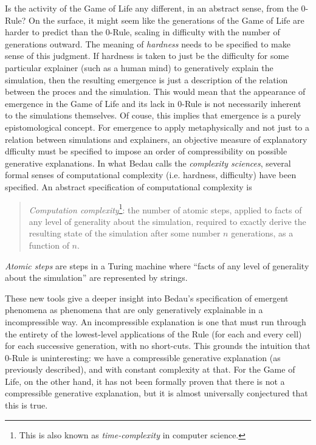 \documentclass{article}
\newcommand{\ti}[1]{\textit{#1}}
\begin{document}
Is the activity of the Game of Life any different, in an abstract sense, from the 0-Rule? On the surface, it might seem like the generations of the Game of Life are harder to predict than the 0-Rule, scaling in difficulty with the number of generations outward. The meaning of \ti{hardness} needs to be specified to make sense of this judgment. If hardness is taken to just be the difficulty for some particular explainer (such as a human mind) to generatively explain the simulation, then the resulting emergence is just a description of the relation between the proces and the simulation. This would mean that the appearance of emergence in the Game of Life and its lack in 0-Rule is not necessarily inherent to the simulations themselves. Of couse, this implies that emergence is a purely epistomological concept. For emergence to apply metaphysically and not just to a relation between simulations and explainers, an objective measure of explanatory dfficulty must be specified to impose an order of compressibility on possible generative explanations. In what Bedau calls the \ti{complexity sciences}, several formal senses of computational complexity (i.e. hardness, difficulty) have been specified. An abstract specification of computational complexity is

\begin{quote}
\ti{Computation complexity}\footnote{This is also known as \ti{time-complexity} in computer science.}: the number of atomic steps, applied to facts of any level of generality about the simulation, required to exactly derive the resulting state of the simulation after some number $n$ generations, as a function of $n$.
\end{quote}

\ti{Atomic steps} are steps in a Turing machine where ``facts of any level of generality about the simulation'' are represented by strings.

These new tools give a deeper insight into Bedau's specification of emergent phenomena as phenomena that are only generatively explainable in a incompressible way. An incompressible explanation is one that must run through the entirety of the lowest-level applications of the Rule (for each and every cell) for each successive generation, with no short-cuts. This grounds the intuition that 0-Rule is uninteresting: we have a compressible generative explanation (as previously described), and with constant complexity at that. For the Game of Life, on the other hand, it has not been formally proven that there is not a compressible generative explanation, but it is almost universally conjectured that this is true.
\end{document}

